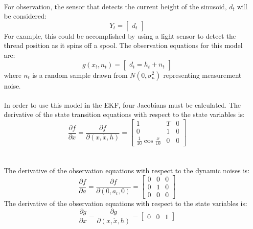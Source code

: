 \documentclass[12pt]{article}
\begin{document}
\\ \indent
For observation, the sensor that detects the current height of the sinusoid, $d_t$ will be considered:
\begin{equation}
Y_t = \begin{bmatrix}
d_t
\end{bmatrix}
\end{equation}
\indent
For example, this could be accomplished by using a light sensor to detect the thread position as it spins off a spool. The observation equations for this model are:
\begin{equation}
g(x_t,n_t) = \begin{bmatrix}
d_t = h_t + n_t
\end{bmatrix}
\end{equation}
\indent
where $n_t$ is a random sample drawn from $N(0,\sigma_n^2)$ representing measurement noise. \\
\\ \indent
In order to use this model in the EKF, four Jacobians must be calculated. The derivative of the state transition equations with respect to the state variables is: 
\begin{equation}
\frac{\partial f}{\partial x} =
\frac{\partial f}{\partial (x,\dot{x},h)} =
\begin{bmatrix}
1 & T & 0  \\
0 & 1 & 0  \\
\frac{1}{10} \cos \frac{x}{10} & 0 & 0 
\end{bmatrix}
\label{eq: Dfx}
\end{equation} \\
\\ \indent
The derivative of the observation equations with respect to the dynamic noises is:
\begin{equation}
\frac{\partial f}{\partial a} =
\frac{\partial f}{\partial (0,a_t,0)} =
\begin{bmatrix}
0 & 0 & 0  \\
0 & 1 & 0  \\
0 & 0 & 0 
\end{bmatrix} 
\label{eq: Dfa}
\end{equation}
\indent
The derivative of the observation equations with respect to the state variables is:
\begin{equation}
\frac{\partial g}{\partial x} =
\frac{\partial g}{\partial (x,\dot{x},h)} =
\begin{bmatrix}
0 & 0 & 1
\end{bmatrix}
\label{eq: Dgx}
\end{equation}
\end{document}
